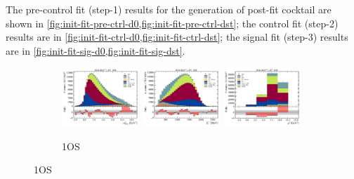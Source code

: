 The pre-control fit (step-1) results for the generation of post-fit cocktail
are shown in \cref{fig:init-fit-pre-ctrl-d0,fig:init-fit-pre-ctrl-dst};
the control fit (step-2) results are in
\cref{fig:init-fit-ctrl-d0,fig:init-fit-ctrl-dst};
the signal fit (step-3) results are in
\cref{fig:init-fit-sig-d0,fig:init-fit-sig-dst}.

\begin{figure}[htb]
    \centering
    \begin{subfigure}{\textwidth}
        \includegraphics[width=0.32\textwidth]{./figs-supplemental-plots/init-fit/pre-ctrl/fit_result-stacked-D0-1os-mmiss2.pdf}
        \includegraphics[width=0.32\textwidth]{./figs-supplemental-plots/init-fit/pre-ctrl/fit_result-stacked-D0-1os-el.pdf}
        \includegraphics[width=0.32\textwidth]{./figs-supplemental-plots/init-fit/pre-ctrl/fit_result-stacked-D0-1os-q2.pdf}
        \caption{1OS}
    \end{subfigure}


\end{figure}
